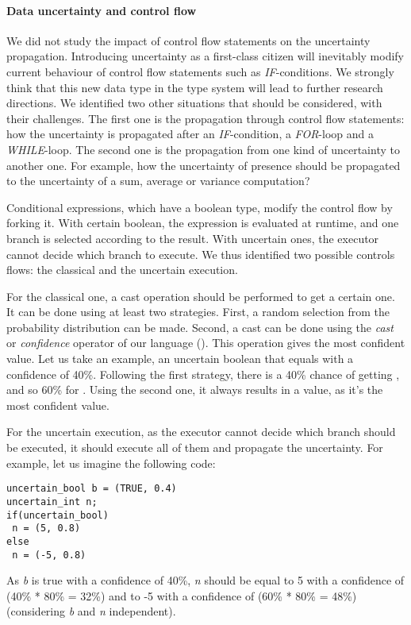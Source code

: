 \paragraph{Data uncertainty and control flow}
We did not study the impact of control flow statements on the uncertainty propagation.
Introducing uncertainty as a first-class citizen will inevitably modify current behaviour of control flow statements such as \textit{IF}-conditions.
We strongly think that this new data type in the type system will lead to further research directions.
We identified two other situations that should be considered, with their challenges.
The first one is the propagation through control flow statements: how the uncertainty is propagated after an \textit{IF}-condition, a \textit{FOR}-loop and a \textit{WHILE}-loop.
The second one is the propagation from one kind of uncertainty to another one.
For example, how the uncertainty of presence should be propagated to the uncertainty of a sum, average or variance computation?

Conditional expressions, which have a boolean type, modify the control flow by forking it.
With certain boolean, the expression is evaluated at runtime, and one branch is selected according to the result.
With uncertain ones, the executor cannot decide which branch to execute.
We thus identified two possible controls flows: the classical and the uncertain execution.

For the classical one, a cast operation should be performed to get a certain one.
It can be done using at least two strategies.
First, a random selection from the probability distribution can be made.
Second, a cast can be done using the \textit{cast} or \textit{confidence} operator of our language (\cf {}).
This operation gives the most confident value.
Let us take an example, an uncertain boolean that equals \false{} with a confidence of 40\%.
Following the first strategy, there is a 40\% chance of getting \false{}, and so 60\% for	 \true{}.
Using the second one, it always results in a \true{} value, as it's the most confident value.

For the uncertain execution, as the executor cannot decide which branch should be executed, it should execute all of them and propagate the uncertainty.
For example, let us imagine the following code:

\begin{lstlisting}[style=pouetpouet2, caption=Example for uncertain control flow]
uncertain_bool b = (TRUE, 0.4)
uncertain_int n;
if(uncertain_bool)
 n = (5, 0.8)
else
 n = (-5, 0.8)
\end{lstlisting}
As \textit{b} is true with a confidence of 40\%, \textit{n} should be equal to 5 with a confidence of (40\% * 80\% = 32\%) and to -5 with a confidence of (60\% * 80\% = 48\%) (considering \textit{b} and \textit{n} independent).


